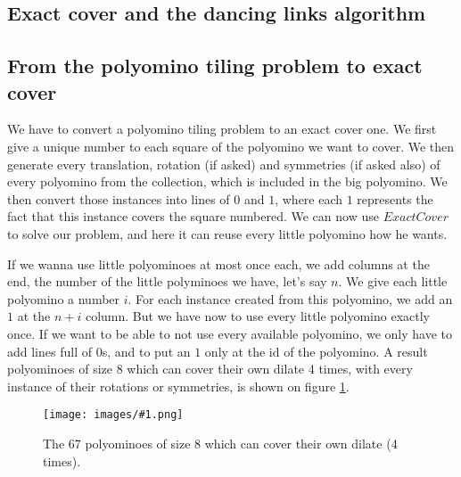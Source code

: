 \documentclass[12pt]{article}
\newcommand{\illustration}[2]{
	\begin{figure}[]
	\begin{center}
	\texttt{[image: images/\#1.png]}
	\caption{#2}
	\label{fig:#1}
	\end{center}
	\end{figure}
}
\begin{document}
\subsection{Exact cover and the dancing links algorithm}

\subsection{From the polyomino tiling problem to exact cover}

We have to convert a polyomino tiling problem to an exact cover one.
We first give a unique number to each square of the polyomino we want to cover.
We then generate every translation, rotation (if asked) and symmetries (if asked also) of every polyomino from the collection, which is included in the big polyomino.
We then convert those instances into lines of $0$ and $1$, where each $1$ represents the fact that this instance covers the square numbered.
We can now use $ExactCover$ to solve our problem, and here it can reuse every little polyomino how he wants.

If we wanna use little polyominoes at most once each, we add columns at the end, the number of the little polyminoes we have, let's say $n$.
We give each little polyomino a number $i$.
For each instance created from this polyomino, we add an $1$ at the $n + i$ column.
But we have now to use every little polyomino exactly once.
If we want to be able to not use every available polyomino, we only have to add lines full of $0$s, and to put an $1$ only at the id of the polyomino.
A result polyominoes of size 8 which can cover their own dilate 4 times, with every instance of their rotations or symmetries, is shown on figure \ref{fig:dilatation}.


\illustration{dilatation}{The 67 polyominoes of size 8 which can cover their own dilate (4 times).}
\end{document}

